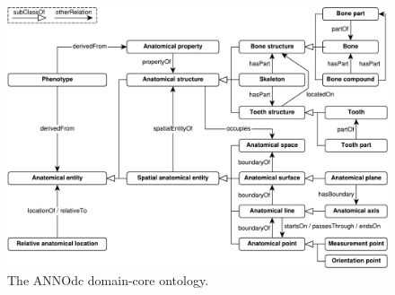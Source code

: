 \documentclass[sw]{iosart2x}
\begin{document}
\begin{figure}[h]
\includegraphics[width=\textwidth]{img/core.pdf}
\caption{The ANNOdc domain-core ontology.}\label{fig:core}
\end{figure}
\end{document}
